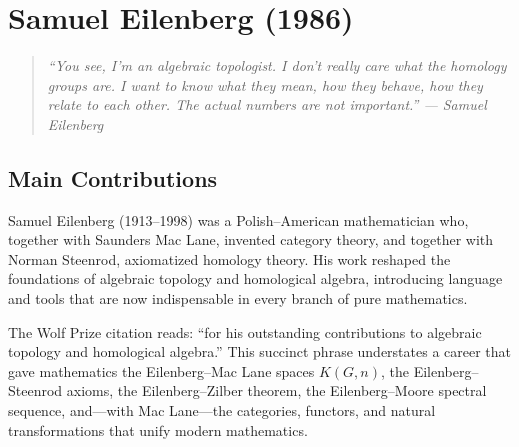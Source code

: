 \let\im\relax
\newcommand{\im}{\operatorname{im}}
\let\End\relax
\newcommand{\End}{\operatorname{End}}
\let\Ker\relax
\newcommand{\Ker}{\operatorname{Ker}}
\let\Aut\relax
\newcommand{\Aut}{\operatorname{Aut}}
\let\Hom\relax
\newcommand{\Hom}{\operatorname{Hom}}
\let\Ext\relax
\newcommand{\Ext}{\operatorname{Ext}}
\let\Tor\relax
\newcommand{\Tor}{\operatorname{Tor}}
\let\Coker\relax
\newcommand{\Coker}{\operatorname{Coker}}
\let\Sing\relax
\newcommand{\Sing}{\operatorname{Sing}}
\let\Spec\relax
\newcommand{\Spec}{\operatorname{Spec}}
\let\Ch\relax
\newcommand{\Ch}{\operatorname{Ch}}
\let\Ho\relax
\newcommand{\Ho}{\operatorname{Ho}}
\let\id\relax
\newcommand{\id}{\operatorname{id}}
\let\Nat\relax
\newcommand{\Nat}{\operatorname{Nat}}
\let\sgn\relax
\newcommand{\sgn}{\operatorname{sgn}}
\let\N\relax
\newcommand{\N}{\mathbb{N}}
\let\R\relax
\newcommand{\R}{\mathbb{R}}
\let\C\relax
\newcommand{\C}{\mathbb{C}}
\let\Q\relax
\newcommand{\Q}{\mathbb{Q}}
\let\Z\relax
\newcommand{\Z}{\mathbb{Z}}

\chapter{Samuel Eilenberg (1986)}

\begin{quote}
\it ``You see, I'm an algebraic topologist. I don't really care what the homology groups are. I want to know what they mean, how they behave, how they relate to each other. The actual numbers are not important.'' --- Samuel Eilenberg
\end{quote}

\section{Main Contributions}

Samuel Eilenberg (1913--1998) was a Polish--American mathematician who, together with Saunders Mac Lane, invented category theory, and together with Norman Steenrod, axiomatized homology theory. His work reshaped the foundations of algebraic topology and homological algebra, introducing language and tools that are now indispensable in every branch of pure mathematics.

The Wolf Prize citation reads: ``for his outstanding contributions to algebraic topology and homological algebra.'' This succinct phrase understates a career that gave mathematics the Eilenberg--Mac Lane spaces $K(G,n)$, the Eilenberg--Steenrod axioms, the Eilenberg--Zilber theorem, the Eilenberg--Moore spectral sequence, and---with Mac Lane---the categories, functors, and natural transformations that unify modern mathematics.

